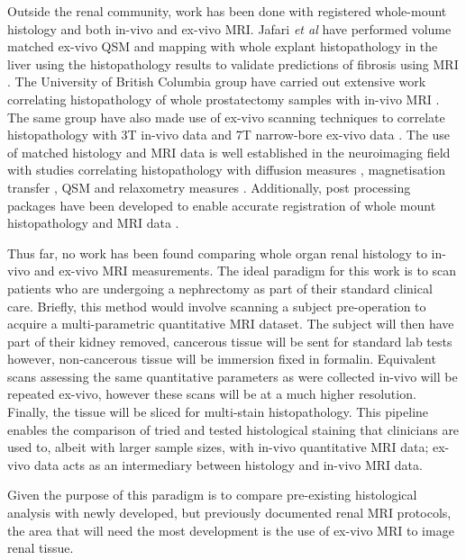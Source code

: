 Outside the renal community, work has been done with registered whole-mount histology and both in-vivo and ex-vivo \ac{MRI}. Jafari \textit{et al} have performed volume matched ex-vivo \ac{QSM} and \ttwostar mapping with whole explant histopathology in the liver using the histopathology results to validate predictions of fibrosis using \ac{MRI} \cite{jafari_integrated_2021}. The University of British Columbia group have carried out extensive work correlating histopathology of whole prostatectomy samples with in-vivo \ac{MRI} \cite{sabouri_mr_2017, dhatt_mri_2020}. The same group have also made use of ex-vivo scanning techniques to correlate histopathology with 3T in-vivo data and 7T narrow-bore ex-vivo data \cite{uribe_vivo_2015}. The use of matched histology and \ac{MRI} data is well established in the neuroimaging field \cite{lazari_can_2021} with studies correlating histopathology with diffusion measures \cite{peters_white_2019, moll_multiple_2011, howard_joint_2019, mollink_white_2019}, magnetisation transfer \cite{mottershead_high_2003, seewann_diffusely_2009}, \ac{QSM} \cite{hametner_influence_2018, stuber_myelin_2014} and relaxometry measures \cite{bagnato_untangling_2018, reeves_combined_2016}. Additionally, post processing packages have been developed to enable accurate registration of whole mount histopathology and \ac{MRI} data \cite{huszar_tensor_2019, huszar_automated_2019}.

Thus far, no work has been found comparing whole organ renal histology to in-vivo and ex-vivo \ac{MRI} measurements. The ideal paradigm for this work is to scan patients who are undergoing a nephrectomy as part of their standard clinical care. Briefly, this method would involve scanning a subject pre-operation to acquire a multi-parametric quantitative \ac{MRI} dataset. The subject will then have part of their kidney removed, cancerous tissue will be sent for standard lab tests however, non-cancerous tissue will be immersion fixed in formalin. Equivalent scans assessing the same quantitative parameters as were collected in-vivo will be repeated ex-vivo, however these scans will be at a much higher resolution. Finally, the tissue will be sliced for multi-stain histopathology. This pipeline enables the comparison of tried and tested histological staining that clinicians are used to, albeit with larger sample sizes, with in-vivo quantitative \ac{MRI} data; ex-vivo data acts as an intermediary between histology and in-vivo \ac{MRI} data.

Given the purpose of this paradigm is to compare pre-existing histological analysis with newly developed, but previously documented renal \ac{MRI} protocols, the area that will need the most development is the use of ex-vivo \ac{MRI} to image renal tissue.

